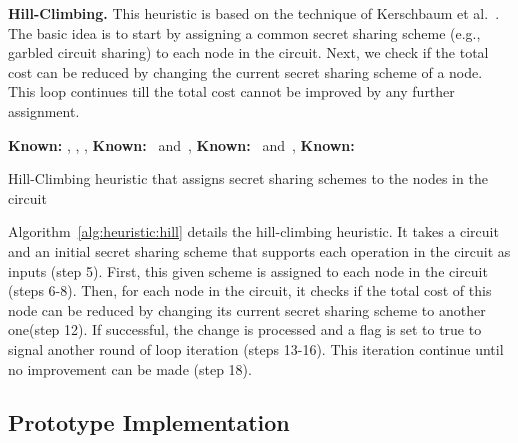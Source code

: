 \documentclass{llncs}
\begin{document}
\textbf{Hill-Climbing.} This heuristic is based on the technique of Kerschbaum et al.~\cite{cite:kerschbaum2014automatic}. The basic idea is to start by assigning a common secret sharing scheme (e.g., garbled circuit sharing) to each node in the circuit. Next, we check if the total cost can be reduced by changing the current secret sharing scheme of a node. This loop continues till the total cost cannot be improved by any further assignment. 

\vspace{-0.6cm}
\begin{algorithm}[hbt]
\footnotesize
	\begin{algorithmic}[1]
		\State \textbf{Known:} , , , 
		\State \textbf{Known:} ~and~, 
		\State \textbf{Known:} ~and~, 
		\State \textbf{Known:} 

		\ForAll{} 
			\State  
		\EndFor

		\Repeat
			\State 
			\ForAll{}
				\State 
				\If{}
					\State 
					\State 
				\EndIf
			\EndFor
		\Until{}
		\EndFunction
	\end{algorithmic}
	
	\caption{Hill-Climbing heuristic that assigns secret sharing schemes to the nodes in the circuit}
	\label{alg:heuristic:hill}
\end{algorithm}

\vspace{-0.45cm}
Algorithm~\ref{alg:heuristic:hill} details the hill-climbing heuristic. It takes a circuit  and an initial secret sharing scheme  that supports each operation in the circuit as inputs (step 5). First, this given scheme is assigned to each node in the circuit (steps 6-8). Then, for each node in the circuit, it checks if the total cost of this node can be reduced by changing its current secret sharing scheme to another one(step 12). If successful, the change is processed and a flag is set to true to signal another round of loop iteration (steps 13-16). This iteration continue until no improvement can be made (step 18).

\subsection{Prototype Implementation}
\label{sec:system:proto}
\end{document}
